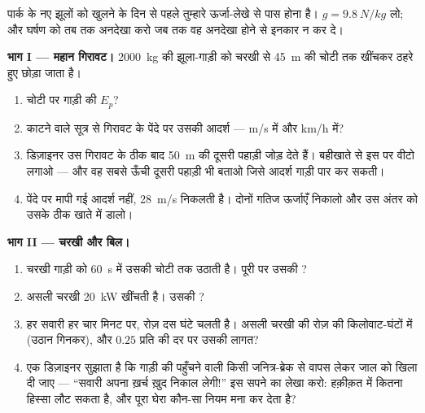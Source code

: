 \begin{problem}\label{pb:g9:energy-conversions:1}
पार्क के नए झूलों को खुलने के दिन से पहले तुम्हारे ऊर्जा-लेखे से पास
होना है। $g = \qty{9.8}{N/kg}$ लो; और घर्षण को तब तक अनदेखा करो जब तक
वह अनदेखा होने से इनकार न कर दे।

\medskip\noindent\textbf{भाग I --- महान गिरावट।}
\qty{2000}{kg} की झूला-गाड़ी को चरखी से \qty{45}{m} की चोटी तक खींचकर
ठहरे हुए छोड़ा जाता है।
\begin{enumerate}
  \item चोटी पर गाड़ी की $E_p$?
  \item {} काटने वाले सूत्र से गिरावट के पेंदे पर उसकी आदर्श
         --- \unit{m/s} में और \unit{km/h} में?
  \item डिज़ाइनर उस गिरावट के ठीक बाद \qty{50}{m} की दूसरी पहाड़ी जोड़
        देते हैं। बहीखाते से इस पर वीटो लगाओ --- और वह सबसे ऊँची
        दूसरी पहाड़ी भी बताओ जिसे आदर्श गाड़ी पार कर सकती।
  \item पेंदे पर मापी गई  आदर्श नहीं, \qty{28}{m/s} निकलती है।
        दोनों गतिज ऊर्जाएँ निकालो और उस अंतर को उसके ठीक खाते में
        डालो।
\end{enumerate}

\medskip\noindent\textbf{भाग II --- चरखी और बिल।}
\begin{enumerate}[resume]
  \item चरखी गाड़ी को \qty{60}{s} में उसकी चोटी तक उठाती है। पूरी
         पर उसकी ?
  \item असली चरखी \qty{20}{kW} खींचती है। उसकी ?
  \item हर सवारी हर चार मिनट पर, रोज़ दस घंटे चलती है। असली चरखी की
        रोज़ की  किलोवाट-घंटों में (उठान गिनकर), और $0.25$ प्रति
         की दर पर उसकी लागत?
  \item एक डिज़ाइनर सुझाता है कि गाड़ी की पहुँचने वाली  किसी
        जनित्र-ब्रेक से वापस लेकर जाल को खिला दी जाए --- ``सवारी अपना
        ख़र्च ख़ुद निकाल लेगी!'' इस सपने का लेखा करो: हक़ीक़त में
        कितना हिस्सा लौट सकता है, और पूरा घेरा कौन-सा नियम मना कर देता
        है?
\end{enumerate}


\end{problem}
